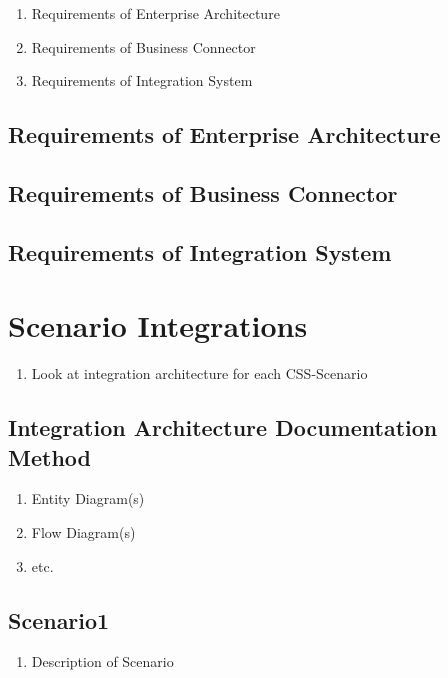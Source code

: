 \documentclass[
     12pt,         %
     a4paper,      %
     BCOR10mm,     %
     DIV14,        %
     ]{scrreprt}
\begin{document}
\begin{enumerate}
     \item Requirements of Enterprise Architecture
     \item Requirements of Business Connector
     \item Requirements of Integration System
\end{enumerate}

\subsection{Requirements of Enterprise Architecture}

\subsection{Requirements of Business Connector}

\subsection{Requirements of Integration System}

\section{Scenario Integrations}
\begin{enumerate}
     \item Look at integration architecture for each CSS-Scenario
\end{enumerate}

\subsection{Integration Architecture Documentation Method}
\begin{enumerate}
     \item Entity Diagram(s)
     \item Flow Diagram(s)
     \item etc.
\end{enumerate}

\subsection{Scenario1}
\begin{enumerate}
     \item Description of Scenario
\end{enumerate}
\end{document}
